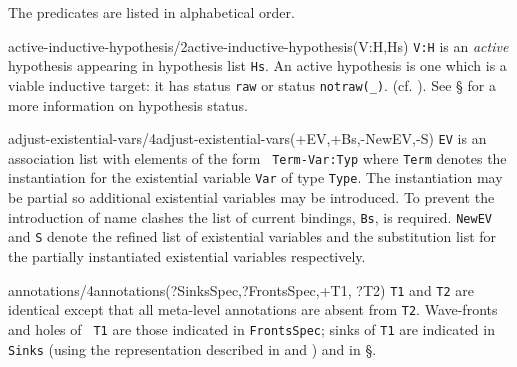 The predicates are listed in alphabetical order.
\begin{predicate}{active-inductive-hypothesis/2}{active-inductive-hypothesis(V:H,Hs)}%
{\tt V:H} is an {\em active\/} hypothesis appearing in hypothesis list
{\tt Hs}.  An active hypothesis is one which is a viable inductive
target: it has status {\tt raw} or status {\tt notraw(\_)}.
(cf. ).  See
\S{} for a more information on hypothesis status.
\end{predicate}


\begin{predicate}{adjust-existential-vars/4}{adjust-existential-vars(+EV,+Bs,-NewEV,-S)}%
{\tt EV} is an association list with elements of the form {\tt
Term-Var:Typ} where {\tt Term} denotes the instantiation for the
existential variable {\tt Var} of type {\tt Type}. The instantiation
may be partial so additional existential variables may be introduced.
To prevent the introduction of name clashes the list of current
bindings, {\tt Bs}, is required. {\tt NewEV} and {\tt S}
denote the refined list of existential variables and the substitution
list for the partially instantiated existential variables
respectively.
\end{predicate}


\begin{predicate}{annotations/4}{annotations(?SinksSpec,?FrontsSpec,+T1, ?T2)}%
{\tt T1} and {\tt T2} are identical except that all meta-level
annotations are absent from {\tt T2}.  Wave-fronts and holes of {\tt
T1} are those indicated in {\tt FrontsSpec}; sinks of {\tt T1} are
indicated in {\tt Sinks} (using the representation described in
 and ) and in \S{}.
\end{predicate}

